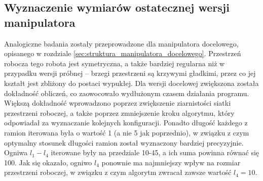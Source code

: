 \documentclass[printmode]{mgr}
\begin{document}
\subsection{Wyznaczenie wymiarów ostatecznej wersji manipulatora}
Analogiczne badania zostały przeprowadzone dla manipulatora docelowego, opisanego w rozdziale \ref{sec:struktura_manipulatora_docelowego}.
Przestrzeń robocza tego robota jest symetryczna, a także bardziej regularna niż w przypadku wersji próbnej -- brzegi przestrzeni są
krzywymi gładkimi, przez co jej kształt jest zbliżony do postaci wypukłej. 
Dla wersji docelowej zwiększona została dokładność obliczeń, co zaowocowało wydłużonym czasem działania
programu. Większą dokładność wprowadzono poprzez zwiększenie ziarnistości siatki przestrzeni roboczej, a także poprzez zmniejszenie kroku algorytmu,
który odpowiadał za wyznaczanie kolejnych konfiguracji. Ponadto długość każdego z ramion iterowana była o wartość 1 (a nie 5 jak poprzednio), 
w związku z czym optymalny stosunek długości ramion został wyznaczony bardziej precyzyjnie. Ogniwa $l_1-l_4$ iterowane były na przedziale
10-45, a ich suma powinna równać się 100. Jak się okazało, ogniwo $l_4$ ponownie ma najmniejszy wpływ na rozmiar przestrzeni roboczej,
w związku z czym algorytm zwracał zawsze wartość $l_4=10$.
\end{document}
